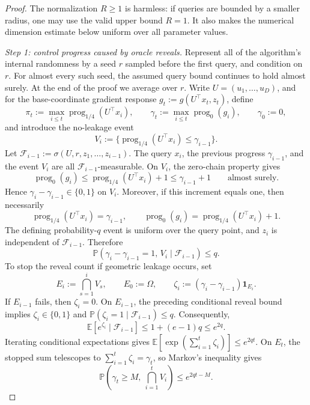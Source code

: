 \documentclass[11pt]{article}
\newcommand{\E}{\mathbb{E}}
\newcommand{\Pbb}{\mathbb{P}}
\newcommand{\prog}{\operatorname{prog}}
\begin{document}
\begin{proof}
The normalization $R\ge1$ is harmless: if queries are bounded by a smaller radius, one may use the valid upper bound
$R=1$. It also makes the numerical dimension estimate below uniform over all parameter values.

\emph{Step 1: control progress caused by oracle reveals.}
Represent all of the algorithm's internal randomness by a seed \(r\) sampled before the first query, and condition on
\(r\). For almost every such seed, the assumed query bound continues to hold almost surely. At the end of the proof
we average over \(r\). Write \(U=(u_1,\ldots,u_D)\), and for the base-coordinate gradient response
\(g_t:=g(U^\top x_t,z_t)\), define
\[
\pi_t:=\max_{i\le t}\prog_{1/4}(U^\top x_i),
\qquad
\gamma_t:=\max_{i\le t}\prog_0(g_i),
\qquad
\gamma_0:=0,
\]
and introduce the no-leakage event
\[
V_i:=\{\prog_{1/4}(U^\top x_i)\le\gamma_{i-1}\}.
\]
Let \(\mathcal F_{i-1}:=\sigma(U,r,z_1,\ldots,z_{i-1})\). The query \(x_i\), the previous progress
\(\gamma_{i-1}\), and the event \(V_i\) are all \(\mathcal F_{i-1}\)-measurable. On \(V_i\), the zero-chain property
gives
\[
\prog_0(g_i)\le\prog_{1/4}(U^\top x_i)+1\le\gamma_{i-1}+1
\qquad\text{almost surely}.
\]
Hence \(\gamma_i-\gamma_{i-1}\in\{0,1\}\) on \(V_i\). Moreover, if this increment equals one, then necessarily
\[
\prog_{1/4}(U^\top x_i)=\gamma_{i-1},
\qquad
\prog_0(g_i)=\prog_{1/4}(U^\top x_i)+1.
\]
The defining probability-\(q\) event is uniform over the query point, and \(z_i\) is independent of
\(\mathcal F_{i-1}\). Therefore
\[
\Pbb(\gamma_i-\gamma_{i-1}=1,\,V_i\mid\mathcal F_{i-1})\le q.
\]
To stop the reveal count if geometric leakage occurs, set
\[
E_i:=\bigcap_{s=1}^iV_s,\qquad E_0:=\Omega,
\qquad
\zeta_i:=(\gamma_i-\gamma_{i-1})\mathbf 1_{E_i}.
\]
If \(E_{i-1}\) fails, then \(\zeta_i=0\). On
\(E_{i-1}\), the preceding conditional reveal bound implies
\(\zeta_i\in\{0,1\}\) and
\(\Pbb(\zeta_i=1\mid\mathcal F_{i-1})\le q\). Consequently,
\[
\E[e^{\zeta_i}\mid\mathcal F_{i-1}]
\le 1+(e-1)q\le e^{2q}.
\]
Iterating conditional expectations gives
\(\E[\exp(\sum_{i=1}^t\zeta_i)]\le e^{2qt}\). On \(E_t\), the stopped sum telescopes to
\(\sum_{i=1}^t\zeta_i=\gamma_t\), so Markov's inequality gives
\begin{equation}
\label{eq:target-reveal-bound}
\Pbb\left(\gamma_t\ge M,\ \bigcap_{i=1}^tV_i\right)
\le e^{2qt-M}.
\end{equation}


\end{proof}
\end{document}
